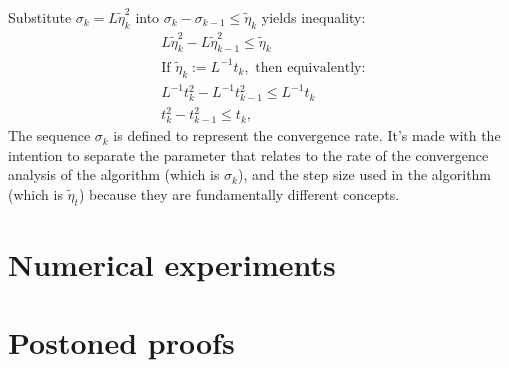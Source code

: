 \documentclass[12pt]{article}
\begin{document}
    \begin{observation}
        Substitute $\sigma_k = L \tilde \eta_k^2$ into $\sigma_k - \sigma_{k - 1} \le \tilde \eta_k$ yields inequality:
        \begin{align*}
            & L \tilde \eta_k^2 - L \tilde \eta_{k - 1}^2 
            \le 
            \tilde \eta_k
            \\
            & \text{If }  \tilde \eta_k := L^{-1} t_k, \text{ then equivalently: }
            \\
            & L^{-1}t_k^2 - L^{-1}t_{k - 1}^2
            \le L^{-1}t_k 
            \\
            & 
            t_k^2 - t_{k - 1}^2
            \le t_k, 
        \end{align*}
        The sequence $\sigma_k$ is defined to represent the convergence rate. 
        It's made with the intention to separate the parameter that relates to the rate of the convergence analysis of the algorithm (which is $\sigma_k$), and the step size used in the algorithm (which is $\tilde \eta_t$) because they are fundamentally different concepts. 
    \end{observation}

\section{Numerical experiments}






\appendix
\section{Postoned proofs}
\end{document}

